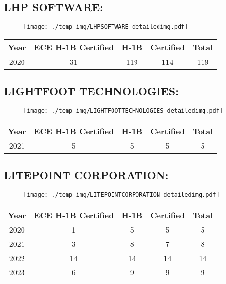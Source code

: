 \documentclass{article}%
\begin{document}
%
\newpage%
\subsection{LHP SOFTWARE:}%
\label{subsec:LHPSOFTWARE}%
\label{LHPSOFTWAREdetailed}%


\begin{figure}[htbp]%
\centering%
\texttt{[image: ./temp\_img/LHPSOFTWARE\_detailedimg.pdf]}%
\end{figure}

%
\begin{longtable}{c|c|c|c|c}%
\hline%
Year&ECE H{-}1B Certified&H{-}1B&Certified&Total\\%
\hline%
2020&31&119&114&119\\%
\hline%
\end{longtable}

%
\newpage%
\subsection{LIGHTFOOT TECHNOLOGIES:}%
\label{subsec:LIGHTFOOTTECHNOLOGIES}%
\label{LIGHTFOOTTECHNOLOGIESdetailed}%


\begin{figure}[htbp]%
\centering%
\texttt{[image: ./temp\_img/LIGHTFOOTTECHNOLOGIES\_detailedimg.pdf]}%
\end{figure}

%
\begin{longtable}{c|c|c|c|c}%
\hline%
Year&ECE H{-}1B Certified&H{-}1B&Certified&Total\\%
\hline%
2021&5&5&5&5\\%
\hline%
\end{longtable}

%
\newpage%
\subsection{LITEPOINT CORPORATION:}%
\label{subsec:LITEPOINTCORPORATION}%
\label{LITEPOINTCORPORATIONdetailed}%


\begin{figure}[htbp]%
\centering%
\texttt{[image: ./temp\_img/LITEPOINTCORPORATION\_detailedimg.pdf]}%
\end{figure}

%
\begin{longtable}{c|c|c|c|c}%
\hline%
Year&ECE H{-}1B Certified&H{-}1B&Certified&Total\\%
\hline%
2020&1&5&5&5\\%
\hline%
2021&3&8&7&8\\%
\hline%
2022&14&14&14&14\\%
\hline%
2023&6&9&9&9\\%
\hline%
\end{longtable}
\end{document}
